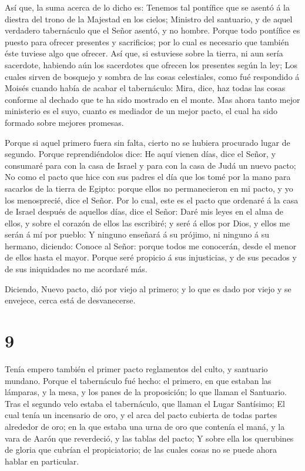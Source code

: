  Así que, la suma acerca de lo dicho es: Tenemos tal
pontífice que se asentó á la diestra del trono de la Majestad en los
cielos;  Ministro del santuario, y de aquel verdadero
tabernáculo que el Señor asentó, y no hombre.  Porque todo
pontífice es puesto para ofrecer presentes y sacrificios; por lo cual es
necesario que también éste tuviese algo que ofrecer.  Así
que, si estuviese sobre la tierra, ni aun sería sacerdote, habiendo aún
los sacerdotes que ofrecen los presentes según la ley;  Los
cuales sirven de bosquejo y sombra de las cosas celestiales, como fué
respondido á Moisés cuando había de acabar el tabernáculo: Mira, dice,
haz todas las cosas conforme al dechado que te ha sido mostrado en el
monte.  Mas ahora tanto mejor ministerio es el suyo, cuanto
es mediador de un mejor pacto, el cual ha sido formado sobre mejores
promesas.

 Porque si aquel primero fuera sin falta, cierto no se
hubiera procurado lugar de segundo.  Porque reprendiéndolos
dice: He aquí vienen días, dice el Señor, y consumaré para con la casa
de Israel y para con la casa de Judá un nuevo pacto;  No
como el pacto que hice con sus padres el día que los tomé por la mano
para sacarlos de la tierra de Egipto: porque ellos no permanecieron en
mi pacto, y yo los menosprecié, dice el Señor.  Por lo
cual, este es el pacto que ordenaré á la casa de Israel después de
aquellos días, dice el Señor: Daré mis leyes en el alma de ellos, y
sobre el corazón de ellos las escribiré; y seré á ellos por Dios, y
ellos me serán á mí por pueblo:  Y ninguno enseñará á su
prójimo, ni ninguno á su hermano, diciendo: Conoce al Señor: porque
todos me conocerán, desde el menor de ellos hasta el mayor.
 Porque seré propicio á sus injusticias, y de sus pecados y
de sus iniquidades no me acordaré más.

 Diciendo, Nuevo pacto, dió por viejo al primero; y lo que
es dado por viejo y se envejece, cerca está de desvanecerse.

\hypertarget{section-8}{%
\section{9}\label{section-8}}

 Tenía empero también el primer pacto reglamentos del culto,
y santuario mundano.  Porque el tabernáculo fué hecho: el
primero, en que estaban las lámparas, y la mesa, y los panes de la
proposición; lo que llaman el Santuario.  Tras el segundo
velo estaba el tabernáculo, que llaman el Lugar Santísimo; 
El cual tenía un incensario de oro, y el arca del pacto cubierta de
todas partes alrededor de oro; en la que estaba una urna de oro que
contenía el maná, y la vara de Aarón que reverdeció, y las tablas del
pacto;  Y sobre ella los querubines de gloria que cubrían el
propiciatorio; de las cuales cosas no se puede ahora hablar en
particular.

